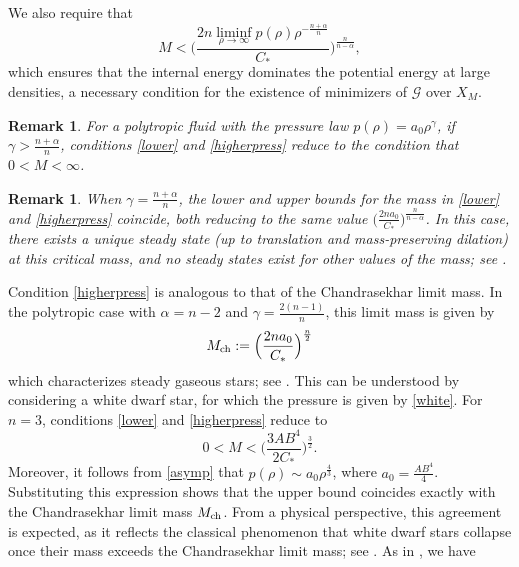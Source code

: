 \documentclass[reqno,11pt]{amsart}
\numberwithin{equation}{section}
\newtheorem{remark}[theorem]{Remark}
\theoremstyle{definition}
\begin{document}
We also require that
\begin{equation}\label{higherpress}
    M < \bigg ( \frac{2n \liminf_{\rho \to \infty} p(\rho) \rho^{-\frac{n+\alpha}{n}}}{C_*} \bigg )^\frac{n}{n-\alpha},
\end{equation}
which ensures that the internal energy dominates the potential energy at large densities, a necessary condition for the existence of minimizers of $\mathcal{G}$ over $X_M$. 

\begin{remark}
For a polytropic fluid with the pressure law
$p(\rho) = a_0 \rho^\gamma$, if $\gamma > \frac{n + \alpha}{n}$, conditions \eqref{lower} and \eqref{higherpress} reduce to the condition that $0<M<\infty$.
\end{remark}

\begin{remark}
    When $\gamma = \frac{n+\alpha}{n}$, 
    the lower and upper bounds for the mass in \eqref{lower} and \eqref{higherpress} 
    coincide, both reducing to
    the same value $\big( \frac{2na_0}{C_*} \big )^\frac{n}{n-\alpha}$.
    In this case, there exists a unique steady state {\rm (}up to translation and mass-preserving dilation{\rm )} 
    at this critical mass, and no steady states exist for other values of the mass{\rm ;} 
    see {\rm \cite[Theorem 3]{Calvez_2021}}.
\end{remark}

Condition \eqref{higherpress} is analogous to that of the Chandrasekhar limit mass. 
In the polytropic case with $\alpha = n-2$ and $\gamma = \frac{2(n-1)}{n}$, 
this limit mass is given by 
$$
M_{\rm ch}:= \Big( \frac{2 n a_0}{C_*} \Big )^\frac{n}{2}
$$ 
which characterizes steady gaseous stars; see \cite{Chandrabook}. 
This can be understood by considering a white dwarf star, for which the pressure 
is given by \eqref{white}. 
For $n=3$, conditions \eqref{lower} and \eqref{higherpress} reduce 
to $$
0<M<\Big (\frac{3AB^4}{2 C_*} \Big )^\frac{3}{2}.
$$ 
Moreover, it follows from \eqref{asymp} that $p(\rho) \sim a_0 \rho^\frac{4}{3}$, 
where $a_0 = \frac{AB^4}{4}$. 
Substituting this expression shows that the upper bound coincides exactly 
with the Chandrasekhar limit mass $M_{\rm ch}$. 
From a physical perspective, this agreement is expected, as it reflects the classical
phenomenon that white dwarf stars collapse once their mass exceeds the Chandrasekhar limit mass; see \cite{Chandrabook}. As in \cite[Theorem 5]{Carrillo_2018}, we have
\end{document}

